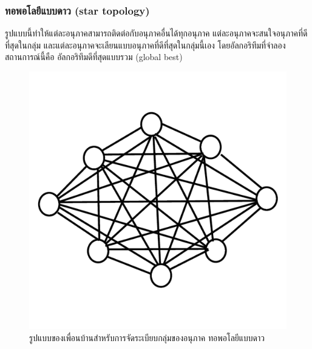 \subsubsection{ทอพอโลยีแบบดาว (star topology)}
รูปแบบนี้ทำให้แต่ละอนุภาคสามารถติดต่อกับอนุภาคอื่นได้ทุกอนุภาค แต่ละอนุภาคจะสนใจอนุภาคที่ดีที่สุดในกลุ่ม และแต่ละอนุภาคจะเลียนแบบอนุภาคที่ดีที่สุดในกลุ่มนี้เอง โดยอัลกอริทึมที่จำลองสถานการณ์นี้คือ อัลกอริทึมดีที่สุดแบบรวม (global best)
\begin{figure}[ht]
    \centering
    \includegraphics[scale=0.3]{images/star_topology.png}
    \caption{รูปแบบของเพื่อนบ้านสำหรับการจัดระเบียบกลุ่มของอนุภาค ทอพอโลยีแบบดาว}
    \label{fig:8}
\end{figure}

